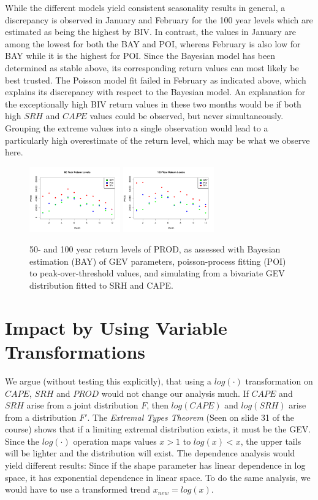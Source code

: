 \documentclass[10pt,conference,compsocconf]{IEEEtran}
\begin{document}
\par
While the different models yield consistent seasonality results in general, a discrepancy is observed in January and February for the 100 year levels which are estimated as being the highest by BIV. In contrast, the values in January are among the lowest for both the BAY and POI, whereas February is also low for BAY while it is the highest for POI. Since the Bayesian model has been determined as stable above, its corresponding return values can most likely be best trusted. The Poisson model fit failed in February as indicated above, which explains its discrepancy with respect to the Bayesian model. An explanation for the exceptionally high BIV return values in these two months would be if both high $SRH$ and $CAPE$ values could be observed, but never simultaneously. Grouping the extreme values into a single observation would lead to a particularly high overestimate of the return level, which may be what we observe here.

\begin{figure}
	\centering
	\includegraphics[width=0.35\textwidth]{../plots/50yr_return.pdf}
	\includegraphics[width=0.35\textwidth]{../plots/100yr_return.pdf}
	\caption{50- and 100 year return levels of PROD, as assessed with Bayesian estimation (BAY) of GEV parameters, poisson-process fitting (POI) to peak-over-threshold values, and simulating from a bivariate GEV distribution fitted to SRH and CAPE.}
	\label{fig:return_lvl}
\end{figure}


\section*{Impact by Using Variable Transformations}
We argue (without testing this explicitly), that using a $log(\cdot)$ transformation on $CAPE$, $SRH$ and $PROD$ would not change our analysis much. If $CAPE$ and $SRH$ arise from a joint distribution $F$, then $log(CAPE)$ and $log(SRH)$ arise from a distribution $F'$. The \textit{Extremal Types Theorem} (Seen on slide 31 of the course) shows that if a limiting extremal distribution exists, it must be the GEV. Since the $log(\cdot)$ operation maps values $x>1$ to $log(x)<x$, the upper tails will be lighter and the distribution will exist. The dependence analysis would yield different results: Since if the shape parameter has linear dependence in log space, it has exponential dependence in linear space. To do the same analysis, we would have to use a transformed trend $x_{new}= log(x)$. 
\end{document}
